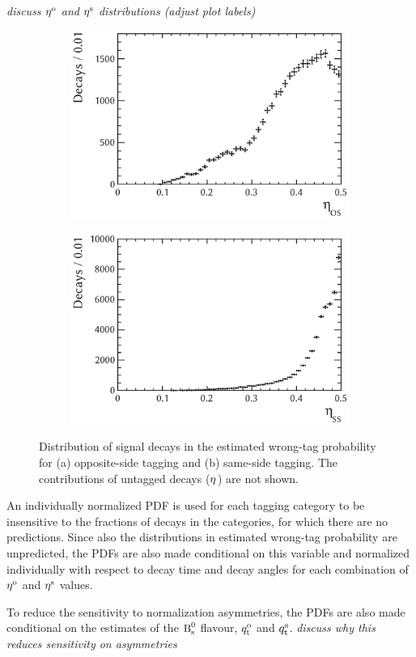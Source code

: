 \textit{discuss $\eta^{\text{o}}$ and $\eta^{\text{s}}$ distributions (adjust plot labels)}
\begin{figure}[htbp]
  \centering
  \begin{subfigure}{0.49\textwidth}
    \includegraphics[width=\textwidth]{graphics/analysis/etaOS}
    \caption{}
    \label{fig:etaOS}
  \end{subfigure}%
  \hfill%
  \begin{subfigure}{0.49\textwidth}
    \includegraphics[width=\textwidth]{graphics/analysis/etaSS}
    \caption{}
    \label{fig:etaSS}
  \end{subfigure}
  \caption{Distribution of \BstoJpsiKK{} signal decays in the estimated wrong-tag probability
           for (a) opposite-side tagging and (b) same-side tagging.
           The contributions of untagged decays ($\eta^{}$) are not shown.}
  \label{fig:etaDists}
\end{figure}

An individually normalized PDF is used for each tagging category to be insensitive to the fractions of decays in the categories, for which
there are no predictions. Since also the distributions in estimated wrong-tag probability are unpredicted, the PDFs are also made
conditional on this variable and normalized individually with respect to decay time and decay angles for each combination of $\eta^{\text{o}}$ and
$\eta^{\text{s}}$ values.

To reduce the sensitivity to \BsBsbar{} normalization asymmetries, the PDFs are also made conditional on the estimates of the $\text{B}_\text{s}^\text{0}$
flavour, ${q_\mathrm{t}^\text{o}}$ and ${q_\mathrm{t}^\text{s}}$.
\textit{discuss why this reduces sensitivity on asymmetries}
